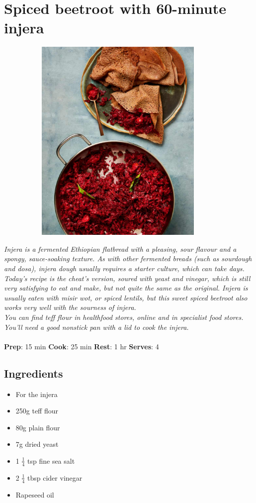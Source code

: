 \documentclass{book}
\begin{document}
\section{Spiced beetroot with 60-minute injera}
\begin{figure}
\centering\includegraphics[width=10cm,height=10cm,keepaspectratio]{Recipe_Pictures/Spiced_beetroot_with_60-minute_injera.png}
\end{figure}
\emph{Injera is a fermented Ethiopian flatbread with a pleasing, sour flavour and a spongy, sauce-soaking texture. As with other fermented breads (such as sourdough and dosa), injera dough usually requires a starter culture, which can take days. Today’s recipe is the cheat’s version, soured with yeast and vinegar, which is still very satisfying to eat and make, but not quite the same as the original. Injera is usually eaten with misir wot, or spiced lentils, but this sweet spiced beetroot also works very well with the sourness of injera.\\ 
You can find teff flour in healthfood stores, online and in specialist food stores. You’ll need a good nonstick pan with a lid to cook the injera.}\\\\ 
\textbf{Prep}: 15 min
\textbf{Cook}: 25 min
\textbf{Rest}: 1 hr
\textbf{Serves}: 4
\subsection*{Ingredients}
\begin{itemize}
\item For the injera
\item 250g teff flour
\item 80g plain flour
\item 7g dried yeast
\item 1 $\frac{1}{4}$ tsp fine sea salt
\item 2 $\frac{1}{4}$ tbsp cider vinegar
\item Rapeseed oil
\end{itemize}
\end{document}
